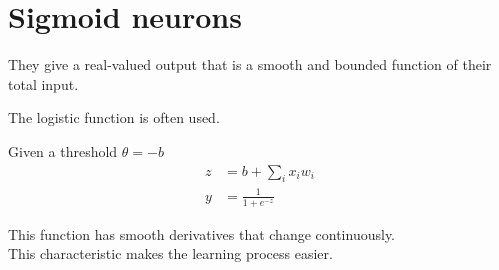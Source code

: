 \documentclass{article}
\begin{document}

\section{Sigmoid neurons}

They give a real-valued output that is a smooth and bounded function of their total input.

The logistic function is often used.

Given a threshold \(\theta=-b\)
\begin{align*}    
    z&=b+\sum_ix_iw_i \\
    y&=\frac{1}{1+e^{-z}}
\end{align*}


This function has smooth derivatives that change continuously. \\
This characteristic makes the learning process easier.

\pagebreak

\end{document}
